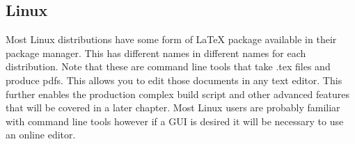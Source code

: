 \subsection{Linux}
Most Linux distributions have some form of \LaTeX{} package available in their package manager. This has different names in different names for each distribution. Note that these are command line tools that take .tex files and produce pdfs. This allows you to edit those documents in any text editor. This further enables the production complex build script and other advanced features that will be covered in a later chapter. Most Linux users are probably familiar with command line tools however if a GUI is desired it will be necessary to use an online editor.